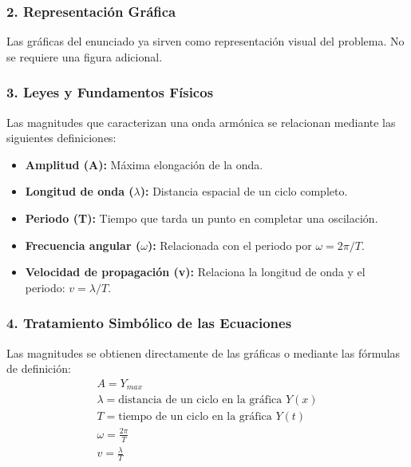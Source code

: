 \subsubsection*{2. Representación Gráfica}
Las gráficas del enunciado ya sirven como representación visual del problema. No se requiere una figura adicional.

\subsubsection*{3. Leyes y Fundamentos Físicos}
Las magnitudes que caracterizan una onda armónica se relacionan mediante las siguientes definiciones:
\begin{itemize}
    \item \textbf{Amplitud (A):} Máxima elongación de la onda.
    \item \textbf{Longitud de onda ($\lambda$):} Distancia espacial de un ciclo completo.
    \item \textbf{Periodo (T):} Tiempo que tarda un punto en completar una oscilación.
    \item \textbf{Frecuencia angular ($\omega$):} Relacionada con el periodo por $\omega = 2\pi / T$.
    \item \textbf{Velocidad de propagación (v):} Relaciona la longitud de onda y el periodo: $v = \lambda / T$.
\end{itemize}

\subsubsection*{4. Tratamiento Simbólico de las Ecuaciones}
Las magnitudes se obtienen directamente de las gráficas o mediante las fórmulas de definición:
\begin{gather}
    A = Y_{max} \\
    \lambda = \text{distancia de un ciclo en la gráfica } Y(x) \\
    T = \text{tiempo de un ciclo en la gráfica } Y(t) \\
    \omega = \frac{2\pi}{T} \\
    v = \frac{\lambda}{T}
\end{gather}

